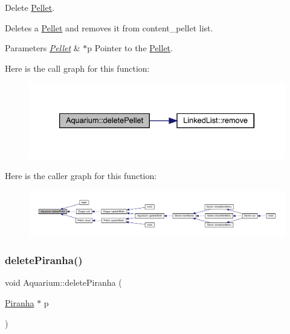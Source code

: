 Delete \mbox{\hyperlink{class_pellet}{Pellet}}. 

Deletes a \mbox{\hyperlink{class_pellet}{Pellet}} and removes it from content\+\_\+pellet list. 
\begin{DoxyParams}{Parameters}
{\em \mbox{\hyperlink{class_pellet}{Pellet}}} & $\ast$p Pointer to the \mbox{\hyperlink{class_pellet}{Pellet}}. \\
\hline
\end{DoxyParams}
Here is the call graph for this function\+:\nopagebreak
\begin{figure}[H]
\begin{center}
\leavevmode
\includegraphics[width=333pt]{class_aquarium_a61329fb56bcb5af2e06fc62568456f1b_cgraph}
\end{center}
\end{figure}
Here is the caller graph for this function\+:
\nopagebreak
\begin{figure}[H]
\begin{center}
\leavevmode
\includegraphics[width=350pt]{class_aquarium_a61329fb56bcb5af2e06fc62568456f1b_icgraph}
\end{center}
\end{figure}
\mbox{\label{class_aquarium_a86cec76f7e0cbbdff79d5cef1e6e7f84}} 
\subsubsection{\texorpdfstring{delete\+Piranha()}{deletePiranha()}}
{\footnotesize\ttfamily void Aquarium\+::delete\+Piranha (\begin{DoxyParamCaption}\item[{\mbox{\hyperlink{class_piranha}{Piranha}} $\ast$}]{p }\end{DoxyParamCaption})}



